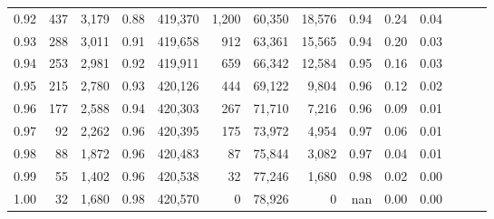 \begin{tabular}{rrrrrrrrrrrrrr}
0.92 &    437 &  3,179 &  0.88 &  419,370 &    1,200 &  60,350 &  18,576 &  0.94 &  0.24 &      0.04 \\
0.93 &    288 &  3,011 &  0.91 &  419,658 &      912 &  63,361 &  15,565 &  0.94 &  0.20 &      0.03 \\
0.94 &    253 &  2,981 &  0.92 &  419,911 &      659 &  66,342 &  12,584 &  0.95 &  0.16 &      0.03 \\
0.95 &    215 &  2,780 &  0.93 &  420,126 &      444 &  69,122 &   9,804 &  0.96 &  0.12 &      0.02 \\
0.96 &    177 &  2,588 &  0.94 &  420,303 &      267 &  71,710 &   7,216 &  0.96 &  0.09 &      0.01 \\
0.97 &     92 &  2,262 &  0.96 &  420,395 &      175 &  73,972 &   4,954 &  0.97 &  0.06 &      0.01 \\
0.98 &     88 &  1,872 &  0.96 &  420,483 &       87 &  75,844 &   3,082 &  0.97 &  0.04 &      0.01 \\
0.99 &     55 &  1,402 &  0.96 &  420,538 &       32 &  77,246 &   1,680 &  0.98 &  0.02 &      0.00 \\
1.00 &     32 &  1,680 &  0.98 &  420,570 &        0 &  78,926 &       0 &   nan &  0.00 &      0.00 \\
\bottomrule
\end{tabular}
